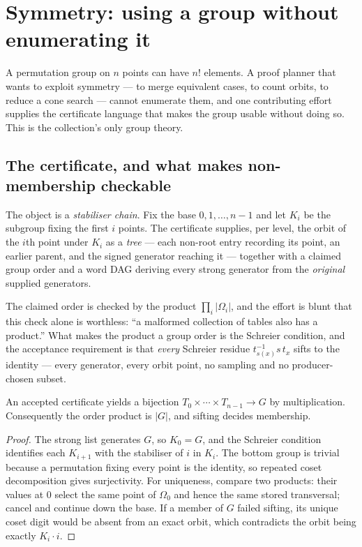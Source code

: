 \section{Symmetry: using a group without enumerating it}
\label{sec:symmetry}

A permutation group on $n$ points can have $n!$ elements. A proof planner that
wants to exploit symmetry --- to merge equivalent cases, to count orbits, to
reduce a cone search --- cannot enumerate them, and one contributing effort
supplies the certificate language that makes the group usable without doing so.
This is the collection's only group theory.

\subsection{The certificate, and what makes non-membership checkable}

The object is a \emph{stabiliser chain}. Fix the base $0,1,\ldots,n-1$ and let
$K_i$ be the subgroup fixing the first $i$ points. The certificate supplies,
per level, the orbit of the $i$th point under $K_i$ as a \emph{tree} --- each
non-root entry recording its point, an earlier parent, and the signed generator
reaching it --- together with a claimed group order and a word DAG deriving
every strong generator from the \emph{original} supplied generators.

The claimed order is checked by the product $\prod_i|\Omega_i|$, and the effort
is blunt that this check alone is worthless: ``a malformed collection of tables
also has a product.'' What makes the product a group order is the Schreier
condition, and the acceptance requirement is that \emph{every} Schreier residue
$t_{s(x)}^{-1}s\,t_x$ sifts to the identity --- every generator, every orbit
point, no sampling and no producer-chosen subset.

\begin{theorem}\label{thm:chain}
An accepted certificate yields a bijection
$T_0\times\cdots\times T_{n-1}\to G$ by multiplication. Consequently the order
product is $|G|$, and sifting decides membership.
\end{theorem}
\begin{proof}
The strong list generates $G$, so $K_0=G$, and the Schreier condition
identifies each $K_{i+1}$ with the stabiliser of $i$ in $K_i$. The bottom group
is trivial because a permutation fixing every point is the identity, so
repeated coset decomposition gives surjectivity. For uniqueness, compare two
products: their values at $0$ select the same point of $\Omega_0$ and hence the
same stored transversal; cancel and continue down the base. If a member of $G$
failed sifting, its unique coset digit would be absent from an exact orbit,
which contradicts the orbit being exactly $K_i\cdot i$.
\end{proof}

